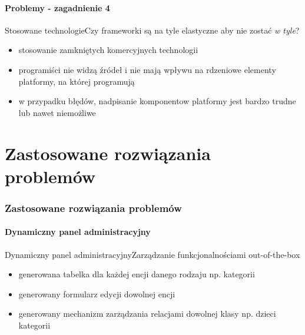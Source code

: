 \documentclass[polish,xcolor=table,9pt,aspectratio=1610,hyperref={pdfpagemode=FullScreen}]{beamer}
\begin{document}
\subsection{Problemy - zagadnienie 4}

\begin{frame}{Stosowane technologie}{Czy frameworki są na tyle elastyczne aby nie zostać \textit{w tyle}?}
	\begin{itemize}
		\item<1-> stosowanie zamkniętych komercyjnych technologii 
		\item<2-> programiści nie widzą źródeł i nie mają wpływu na rdzeniowe elementy platformy, na której programują 
		\item<3-> w przypadku błędów, nadpisanie komponentow platformy jest bardzo trudne lub nawet niemożliwe
	\end{itemize}
\end{frame}

\part{Zastosowane rozwiązania problemów}

\section{Zastosowane rozwiązania problemów}

\subsection{Dynamiczny panel administracyjny}

\begin{frame}{Dynamiczny panel administracyjny}{Zarządzanie funkcjonalnościami out-of-the-box}
	\begin{itemize}
		\item<1-> generowana tabelka dla każdej encji danego rodzaju np. kategorii 
		\item<2-> generowany formularz edycji dowolnej encji
		\item<3-> generowany mechanizm zarządzania relacjami dowolnej klasy np. dzieci kategorii
	\end{itemize}
	
\end{frame}
\end{document}

